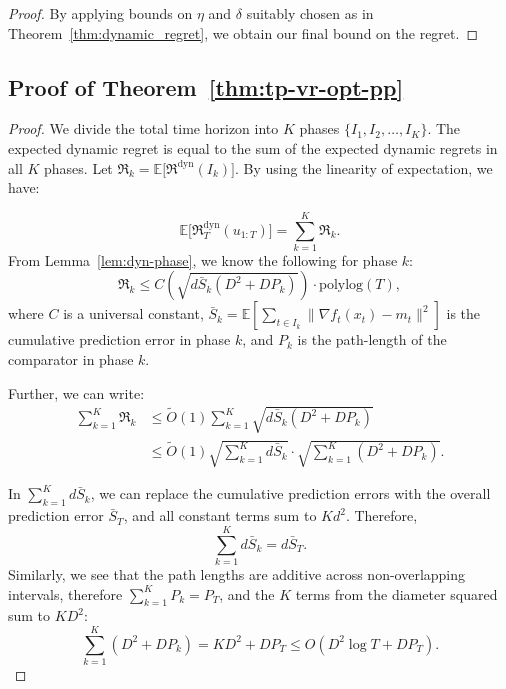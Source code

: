 \documentclass[journal,onecolumn]{IEEEtran}
\theoremstyle{plain}
\theoremstyle{definition}
\theoremstyle{remark}
\newcommand{\regret}{\mathfrak{R}}
\begin{document}
{\begin{proof}
    By applying bounds on $\eta$ and $\delta$ suitably chosen as in Theorem~\ref{thm:dynamic_regret}, we obtain our final bound on the regret.
\end{proof}

\subsection{Proof of Theorem~\ref{thm:tp-vr-opt-pp}}
\begin{proof}
We divide the total time horizon into $K$ phases $\{I_1,I_2,\ldots,I_K\}$. The expected dynamic regret is equal to the sum of the expected dynamic regrets in all $K$ phases.
Let $\regret_k = \mathbb{E}\big[\regret^{\mathrm{dyn}}(I_k)\big]$. By using the linearity of expectation, we have:

\begin{equation*}
\mathbb{E}\bigl[\regret_T^{\mathrm{dyn}}(u_{1:T})\bigr] = \sum_{k=1}^K \regret_k.
\end{equation*}
From Lemma~\ref{lem:dyn-phase}, we know the following for phase $k$:
\begin{equation*}
\regret_k \le C \left(\sqrt{d\bar{S}_k(D^2 + D P_k)}\right) \cdot \text{polylog}(T),
\end{equation*}
where $C$ is a universal constant, $\bar{S}_k = \mathbb{E}[\sum_{t \in I_k} \|\nabla f_t(x_t) - m_t\|^2]$ is the cumulative prediction error in phase $k$, and $P_k$ is the path-length of the comparator in phase $k$.


Further, we can write:
\begin{align*}
\sum_{k=1}^K \regret_k 
&\le \widetilde{O}(1) \sum_{k=1}^K \sqrt{d\bar{S}_k(D^2 + D P_k)} \\
&\le \widetilde{O}(1) \sqrt{\sum_{k=1}^K d\bar{S}_k} \cdot \sqrt{\sum_{k=1}^K (D^2 + D P_k)}.
\end{align*}

In $\sum_{k=1}^K d\bar{S}_k$, we can replace the cumulative prediction errors with the overall prediction error $\bar{S}_T$, and all constant terms sum to $Kd^2$. Therefore,
\begin{equation*}
    \sum_{k=1}^K d\bar{S}_k = d\bar{S}_T.
\end{equation*}
Similarly, we see that the path lengths are additive across non-overlapping intervals, therefore $\sum_{k=1}^K P_k = P_T$, and the $K$ terms from the diameter squared sum to $K D^2$:
\begin{equation*}
    \sum_{k=1}^K (D^2 + D P_k) = K D^2 + D P_T \le O(D^2 \log T + D P_T).
\end{equation*}


\end{proof}}
\end{document}
